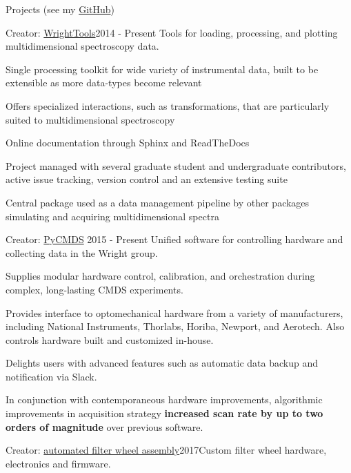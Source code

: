 \documentclass{resume}  %
\begin{document}
\clearpage

\begin{rSection}{Projects (see my \href{https://github.com/untzag}{GitHub})}
  \begin{rSubsection}{Creator: \href{http://wright.tools}{WrightTools}}{2014 - Present}
    {Tools for loading, processing, and plotting multidimensional spectroscopy data.}{}
    \item Single processing toolkit for wide variety of instrumental data, built to be extensible
      as more data-types become relevant
    \item Offers specialized interactions, such as transformations, that are particularly suited to
      multidimensional spectroscopy
    \item Online documentation through Sphinx and ReadTheDocs
    \item Project managed with several graduate student and undergraduate contributors, active
      issue tracking, version control and an extensive testing suite
    \item Central package used as a data management pipeline by other packages simulating and
      acquiring multidimensional spectra
  \end{rSubsection}
  \begin{rSubsection}{Creator: \href{https://github.com/wright-group/PyCMDS}{PyCMDS}}
    {2015 - Present}
    {Unified software for controlling hardware and collecting data in the Wright group.}{}
    \item Supplies modular hardware control, calibration, and orchestration during complex,
      long-lasting CMDS experiments.
    \item Provides interface to optomechanical hardware from a variety of manufacturers, including
      National Instruments, Thorlabs, Horiba, Newport, and Aerotech. Also controls hardware built
      and customized in-house.
    \item Delights users with advanced features such as automatic data backup and notification via
      Slack.
    \item In conjunction with contemporaneous hardware improvements, algorithmic improvements in
      acquisition strategy \textbf{increased scan rate by up to two orders of magnitude} over
      previous software.
  \end{rSubsection}
  \begin{rSubsection}{Creator: \href{https://github.com/wright-group/FilterWheels}{automated filter
        wheel assembly}}{2017}{Custom filter wheel hardware, electronics and firmware.}{}

\end{rSubsection}
\end{rSection}
\end{document}
